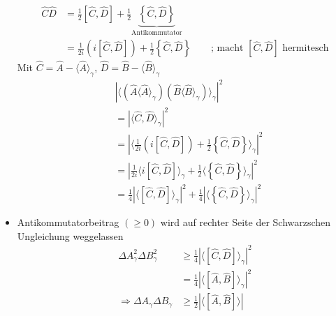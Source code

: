 \documentclass[10pt,article,colorback,accentcolor=tud9d]{scrartcl}
\begin{document}
\begin{fleqn}
\begin{itemize}
      \begin{equation}
      \begin{aligned}
        \hat{C}\hat{D}&=\frac{1}{2}\left[\hat{C},\hat{D}\right]+\frac{1}{2}\underbrace{\left\{\hat{C},\hat{D}\right\}}_{\text{Antikommutator}}\\
        &=\frac{1}{2i}\left(i\left[\hat{C},\hat{D}\right]\right)+\frac{1}{2}\left\{\hat{C},\hat{D}\right\} \quad \quad \text{; macht $\left[\hat{C},\hat{D}\right]$ hermitesch}
      \end{aligned}
      \end{equation}
      Mit $\hat{C}=\hat{A}-\langle\hat{A}\rangle_\gamma$, $\hat{D}=\hat{B}-\langle\hat{B}\rangle_\gamma$
      \begin{equation}
      \begin{aligned}
        &\left|\langle\left(\hat{A}\langle\hat{A}\rangle_\gamma\right)\left(\hat{B}\langle\hat{B}\rangle_\gamma\right)\rangle_\gamma\right|^2\\
        &=\left|\langle\hat{C},\hat{D}\rangle_\gamma\right|^2\\
        &=\left|\langle\frac{1}{2i}\left(i\left[\hat{C},\hat{D}\right]\right)+\frac{1}{2}\left\{\hat{C},\hat{D}\right\}\rangle_\gamma\right|^2\\
        &=\left|\frac{1}{2i}\langle i\left[\hat{C},\hat{D}\right]\rangle_\gamma+\frac{1}{2}\langle\left\{\hat{C},\hat{D}\right\}\rangle_\gamma\right|^2\\
        &=\frac{1}{4}\left|\langle\left[\hat{C},\hat{D}\right]\rangle_\gamma\right|^2+\frac{1}{4}\left|\langle\left\{\hat{C},\hat{D}\right\}\rangle_\gamma\right|^2
      \end{aligned}
      \end{equation}
    \item Antikommutatorbeitrag $(\geq 0)$ wird auf rechter Seite der Schwarzschen Ungleichung weggelassen
      \begin{equation}
      \begin{aligned}
        \Delta A_\gamma^2 \Delta B_\gamma^2 &\geq \frac{1}{4}\left|\langle\left[\hat{C},\hat{D}\right]\rangle_\gamma\right|^2\\
        &=\frac{1}{4}\left|\langle\left[\hat{A},\hat{B}\right]\rangle_\gamma\right|^2\\
        \Rightarrow \Delta A_\gamma \Delta B_\gamma &\geq \frac{1}{2}\left|\langle\left[\hat{A},\hat{B}\right]\rangle\right|
      \end{aligned}
      \end{equation}
  \end{itemize}


\end{fleqn}
\end{document}
